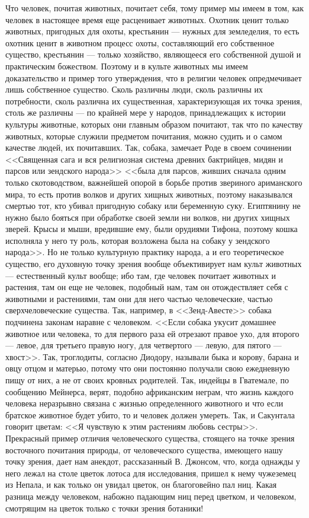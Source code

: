 \documentclass[12pt]{article}
\begin{document}
Что человек, почитая животных, почитает себя, тому пример мы имеем в том, как человек в настоящее время еще расценивает животных. Охотник ценит только животных, пригодных для охоты, крестьянин --- нужных для земледелия, то есть охотник ценит в животном процесс охоты, составляющий его собственное существо, крестьянин --- только хозяйство, являющееся его собственной душой и практическим божеством. Поэтому и в культе животных мы имеем доказательство и пример того утверждения, что в религии человек опредмечивает лишь собственное существо. Сколь различны люди, сколь различны их потребности, сколь различна их существенная, характеризующая их точка зрения, столь же различны --- по крайней мере у народов, принадлежащих к истории культуры животные, которых они главным образом почитают, так что по качеству животных, которые служили предметом почитания, можно судить и о самом качестве людей, их почитавших. Так, собака, замечает Роде в своем сочинении <<Священная сага и вся религиозная система древних бактрийцев, мидян и парсов или зендского народа>>  <<была для парсов, живших сначала одним только скотоводством, важнейшей опорой в борьбе против звериного ариманского мира, то есть против волков и других хищных животных, поэтому наказывался смертью тот, кто убивал пригодную собаку или беременную суку. Египтянину не нужно было бояться при обработке своей земли ни волков, ни других хищных зверей. Крысы и мыши, вредившие ему, были орудиями Тифона, поэтому кошка исполняла у него ту роль, которая возложена была на собаку у зендского народа>>. Но не только культурную практику народа, а и его теоретическое существо, его духовную точку зрения вообще объективирует нам культ животных --- естественный культ вообще; ибо там, где человек почитает животных и растения, там он еще не человек, подобный нам, там он отождествляет себя с животными и растениями, там они для него частью человеческие, частью сверхчеловеческие существа. Так, например, в <<Зенд-Авесте>> собака подчинена законам наравне с человеком. <<Если собака укусит домашнее животное или человека, то для первого раза ей отрезают правое ухо, для второго --- левое, для третьего правую ногу, для четвертого --- левую, для пятого --- хвост>>. Так, троглодиты, согласно Диодору, называли быка и корову, барана и овцу отцом и матерью, потому что они постоянно получали свою ежедневную пищу от них, а не от своих кровных родителей. Так, индейцы в Гватемале, по сообщению Мейнерса, верят, подобно африканским неграм, что жизнь каждого человека неразрывно связана с жизнью определенного животного и что если братское животное будет убито, то и человек должен умереть. Так, и Сакунтала говорит цветам: <<Я чувствую к этим растениям любовь сестры>>. Прекрасный пример отличия человеческого существа, стоящего на точке зрения восточного почитания природы, от человеческого существа, имеющего нашу точку зрения, дает нам анекдот, рассказанный В. Джонсом, что, когда однажды у него лежал на столе цветок лотоса для исследования, пришел к нему чужеземец из Непала, и как только он увидал цветок, он благоговейно пал ниц. Какая разница между человеком, набожно падающим ниц перед цветком, и человеком, смотрящим на цветок только с точки зрения ботаники! 
\end{document}
